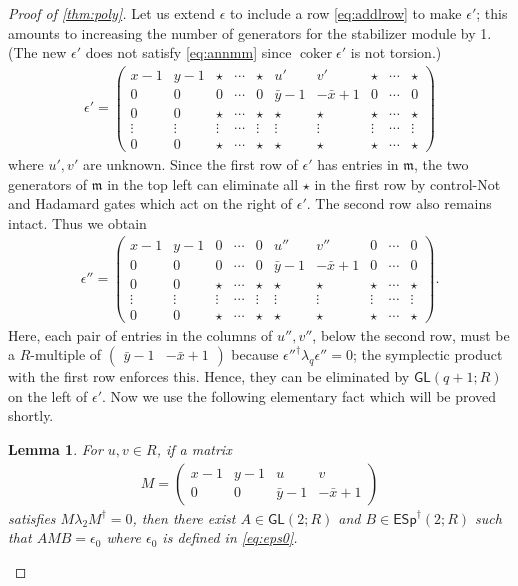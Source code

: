 \documentclass[aps,pra,
floatfix,notitlepage,
nofootinbib,
longbibliography,11pt]{revtex4-1}
\newtheorem{lemma}{Lemma}[section]
\theoremstyle{definition}
\DeclareMathOperator{\coker}{\mathrm{coker}}
\newcommand{\mm}{\mathfrak{m}}
\newcommand{\GL}{\mathsf{GL}}
\newcommand{\ESp}{{\mathsf{ESp}^\dagger}}
\begin{document}
\begin{proof}[Proof of \cref{thm:poly}]
Let us extend $\epsilon$ to include a row \cref{eq:addlrow} to make $\epsilon'$;
this amounts to increasing the number of generators for the stabilizer module by 1.
(The new $\epsilon'$ does not satisfy \cref{eq:annmm} since $\coker \epsilon'$ is not torsion.)
\begin{align}
\epsilon' = \begin{pmatrix}
x - 1 & y-1 &  \star & \cdots & \star & u' & v' & \star &\cdots & \star \\
0 & 0 &        0 &\cdots & 0& \bar y - 1 & -\bar x + 1 & 0 &\cdots & 0\\
0     & 0   &  \star & \cdots &\star & \star & \star & \star & \cdots & \star\\
\vdots&\vdots& \vdots & \cdots &\vdots & \vdots & \vdots & \vdots & \cdots& \vdots\\
0     & 0   &  \star & \cdots &\star & \star & \star & \star & \cdots & \star
\end{pmatrix} \label{eq:eps2}
\end{align}
where $u',v'$ are unknown.
Since the first row of $\epsilon'$ has entries in $\mm$,
the two generators of $\mm$ in the top left can eliminate all $\star$ in the first row
by control-Not and Hadamard gates which act on the right of $\epsilon'$.
The second row also remains intact. Thus we obtain
\begin{align}
\epsilon'' = \begin{pmatrix}
x - 1 & y-1 &  0 & \cdots & 0 & u'' & v'' & 0 &\cdots & 0 \\
0 & 0 &        0 &\cdots & 0& \bar y - 1 & -\bar x + 1 & 0 &\cdots & 0\\
0     & 0   &  \star & \cdots &\star & \star & \star & \star & \cdots & \star\\
\vdots&\vdots& \vdots & \cdots &\vdots & \vdots & \vdots & \vdots & \cdots& \vdots\\
0     & 0   &  \star & \cdots &\star & \star & \star & \star & \cdots & \star
\end{pmatrix}. \label{eq:eps3}
\end{align}
Here, each pair of entries in the columns of $u'',v''$, below the second row, must be a $R$-multiple of
$\begin{pmatrix}
\bar y - 1 & -\bar x +1
\end{pmatrix}$
because $\epsilon''^\dagger \lambda_q \epsilon'' = 0$;
the symplectic product with the first row enforces this.
Hence, they can be eliminated by $\GL(q+1;R)$ on the left of $\epsilon'$.
Now we use the following elementary fact which will be proved shortly.
\begin{lemma}\label{lem:xyab}
For $u,v \in R$, if a matrix 
\begin{align}
M = 
\begin{pmatrix}
x-1 & y-1 & u & v \\
0   & 0   & \bar y -1 & -\bar x + 1
\end{pmatrix}
\end{align}
satisfies $M \lambda_2 M^\dagger = 0$,
then 
there exist $A \in \GL(2;R)$ and $B \in \ESp(2;R)$
such that $A M B = \epsilon_0$ where $\epsilon_0$ is defined in \cref{eq:eps0}.
\end{lemma}


\end{proof}
\end{document}
